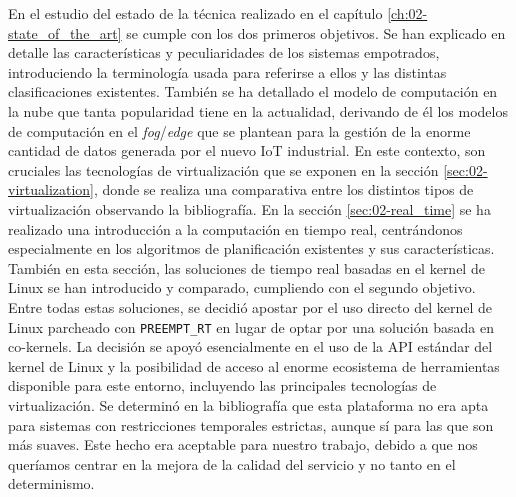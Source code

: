 En el estudio del estado de la técnica realizado en el capítulo
\ref{ch:02-state_of_the_art} se cumple con los dos primeros objetivos. Se han
explicado en detalle las características y peculiaridades de los sistemas
empotrados, introduciendo la terminología usada para referirse a ellos y las
distintas clasificaciones existentes. También se ha detallado el modelo de
computación en la nube que tanta popularidad tiene en la actualidad, derivando
de él los modelos de computación en el \textit{fog}/\textit{edge} que se
plantean para la gestión de la enorme cantidad de datos generada por el nuevo
IoT industrial. En este contexto, son cruciales las tecnologías de
virtualización que se exponen en la sección \ref{sec:02-virtualization}, donde
se realiza una comparativa entre los distintos tipos de virtualización
observando la bibliografía. En la sección \ref{sec:02-real_time} se ha realizado
una introducción a la computación en tiempo real, centrándonos especialmente en
los algoritmos de planificación existentes y sus características. También en
esta sección, las soluciones de tiempo real basadas en el kernel de Linux se han
introducido y comparado, cumpliendo con el segundo objetivo. Entre todas estas
soluciones, se decidió apostar por el uso directo del kernel de Linux parcheado
con \texttt{PREEMPT\_RT} en lugar de optar por una solución basada en
co-kernels. La decisión se apoyó esencialmente en el uso de la API estándar del
kernel de Linux y la posibilidad de acceso al enorme ecosistema de herramientas
disponible para este entorno, incluyendo las principales tecnologías de
virtualización. Se determinó en la bibliografía que esta plataforma no era apta
para sistemas con restricciones temporales estrictas, aunque sí para las que son
más suaves. Este hecho era aceptable para nuestro trabajo, debido a que nos
queríamos centrar en la mejora de la calidad del servicio y no tanto en el
determinismo.

